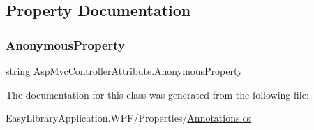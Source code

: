 \subsection{Property Documentation}
\mbox{\label{class_asp_mvc_controller_attribute_adb49d7099fe6a2366db45aca2e3488ab}} 
\subsubsection{\texorpdfstring{Anonymous\+Property}{AnonymousProperty}}
{\footnotesize\ttfamily string Asp\+Mvc\+Controller\+Attribute.\+Anonymous\+Property\hspace{0.3cm}{\ttfamily [get]}}



The documentation for this class was generated from the following file\+:\begin{DoxyCompactItemize}
\item 
Easy\+Library\+Application.\+W\+P\+F/\+Properties/\mbox{\hyperlink{_annotations_8cs}{Annotations.\+cs}}\end{DoxyCompactItemize}
